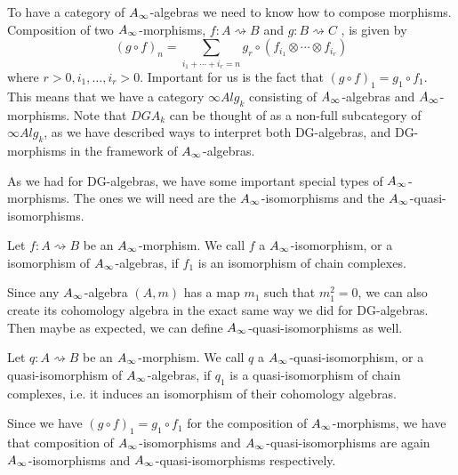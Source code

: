 To have a category of $\A$-algebras we need to know how to compose morphisms. Composition of two $\A$-morphisms, $f\colon A\rightsquigarrow B$ and $g\colon B\rightsquigarrow C$
, is given by 
\begin{equation*}
    (g\circ f)_n = \sum_{i_1+\cdots + i_r = n}g_r\circ (f_{i_1}\otimes \cdots \otimes f_{i_r})
\end{equation*}
where $r>0, i_1, \ldots, i_r>0$. Important for us is the fact that $(g\circ f)_1 = g_1\circ f_1$. This means that we have a category $\infty Alg_k$ consisting of $\A$-algebras and $\A$-morphisms. Note that $DGA_k$ can be thought of as a non-full subcategory of $\infty Alg_k$, as we have described ways to interpret both DG-algebras, and DG-morphisms in the framework of $\A$-algebras.  

As we had for DG-algebras, we have some important special types of $\A$-morphisms. The ones we will need are the $\A$-isomorphisms and the $\A$-quasi-isomorphisms.

\begin{definition}[$\A$-isomorphism]
\label{def:A_infinity-isomorphism}
Let $f\colon A\rightsquigarrow B$ be an $\A$-morphism. We call $f$ a $\A$-isomorphism, or a isomorphism of $\A$-algebras, if $f_1$ is an isomorphism of chain complexes.
\end{definition}

Since any $\A$-algebra $(A, m)$ has a map $m_1$ such that $m_1^2=0$, we can also create its cohomology algebra in the exact same way we did for DG-algebras. Then maybe as expected, we can define $\A$-quasi-isomorphisms as well.

\begin{definition}
\label{def:A_infinity-quasi-isomorphism}
Let $q\colon A\rightsquigarrow B$ be an $\A$-morphism. We call $q$ a $\A$-quasi-isomorphism, or a quasi-isomorphism of $\A$-algebras, if $q_1$ is a quasi-isomorphism of chain complexes, i.e. it induces an isomorphism of their cohomology algebras. 
\end{definition}

Since we have $(g\circ f)_1 = g_1\circ f_1$ for the composition of $\A$-morphisms, we have that composition of $\A$-isomorphisms and $\A$-quasi-isomorphisms are again $\A$-isomorphisms and $\A$-quasi-isomorphisms respectively.

